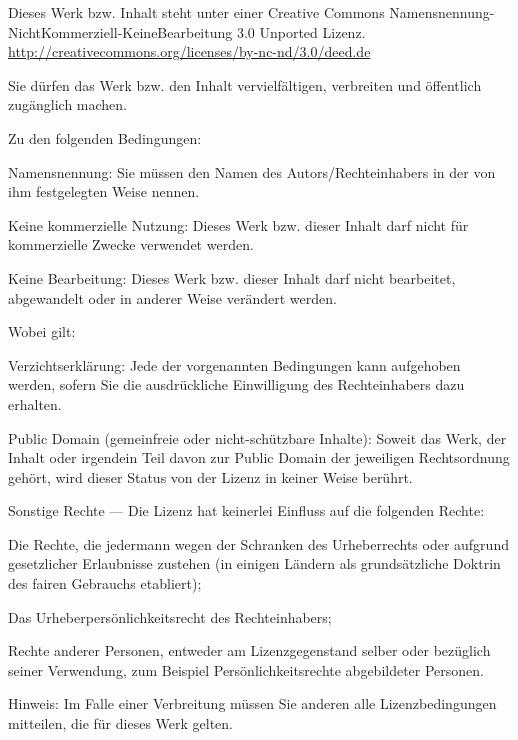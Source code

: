 
{\smaller\setlength{\parindent}{0pt}%
\raggedright\label{copyright-details}
{\centering

{\large\ccbyncnd}
\bigskip

Dieses Werk bzw. Inhalt steht unter einer Creative Commons Namensnennung-NichtKommerziell-KeineBearbeitung 3.0 Unported Lizenz.\\
\href{http://creativecommons.org/licenses/by-nc-nd/3.0/deed.de}{http://creativecommons.org/licenses/by-nc-nd/3.0/deed.de}

}

Sie dürfen das Werk bzw. den Inhalt vervielfältigen, verbreiten und öffentlich zugänglich machen.

Zu den folgenden Bedingungen:
\vspace*{-1.5\baselineskip}

\begin{packeditemize}
\item Namensnennung: Sie müssen den Namen des Autors/Rechteinhabers in der von ihm festgelegten Weise nennen.
\item Keine kommerzielle Nutzung: Dieses Werk bzw. dieser Inhalt darf nicht für kommerzielle Zwecke verwendet werden.
\item Keine Bearbeitung: Dieses Werk bzw. dieser Inhalt darf nicht bearbeitet, abgewandelt oder in anderer Weise verändert werden.
\end{packeditemize}

Wobei gilt:
\vspace*{-1.5\baselineskip}

\begin{packeditemize}
    \item Verzichtserklärung: Jede der vorgenannten Bedingungen kann aufgehoben werden, sofern Sie die ausdrückliche Einwilligung des Rechteinhabers dazu erhalten.
    \item Public Domain (gemeinfreie oder nicht-schützbare Inhalte): Soweit das Werk, der Inhalt oder irgendein Teil davon zur Public Domain der jeweiligen Rechtsordnung gehört, wird dieser Status von der Lizenz in keiner Weise berührt.
    \item Sonstige Rechte — Die Lizenz hat keinerlei Einfluss auf die folgenden Rechte:
        \begin{packeditemize}
            \item Die Rechte, die jedermann wegen der Schranken des Urheberrechts oder aufgrund gesetzlicher Erlaubnisse zustehen (in einigen Ländern als grundsätzliche Doktrin des fairen Gebrauchs etabliert);
            \item Das Urheberpersönlichkeitsrecht des Rechteinhabers;
            \item Rechte anderer Personen, entweder am Lizenzgegenstand selber oder bezüglich seiner Verwendung, zum Beispiel Persönlichkeitsrechte abgebildeter Personen.
        \end{packeditemize}
    \item Hinweis: Im Falle einer Verbreitung müssen Sie anderen alle Lizenzbedingungen mitteilen, die für dieses Werk gelten.
\end{packeditemize}

}
